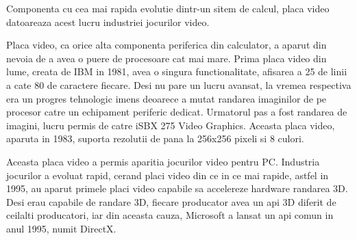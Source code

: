 Componenta cu cea mai rapida evolutie dintr-un sitem de calcul, placa video datoareaza acest lucru
industriei jocurilor video.

Placa video, ca orice alta componenta periferica din calculator, a aparut din nevoia de a avea o
puere de procesoare cat mai mare. Prima placa video din lume, creata de IBM in 1981, avea o singura functionalitate,
afisarea a 25 de linii a cate 80 de caractere fiecare. Desi nu pare un lucru avansat, la vremea
respectiva era un progres tehnologic imens deoarece a mutat randarea imaginilor de pe procesor
catre un echipament periferic dedicat. Urmatorul pas a fost randarea de imagini, lucru permis de
catre iSBX 275 Video Graphics. Aceasta placa video, aparuta in 1983, suporta rezolutii de pana la
256x256 pixeli si 8 culori. 

Aceasta placa video a permis aparitia jocurilor video pentru PC. Industria jocurilor a evoluat
rapid, cerand placi video din ce in ce mai rapide, astfel in 1995, au aparut primele placi video
capabile sa accelereze hardware randarea 3D. Desi erau capabile de randare 3D, fiecare producator
avea un api 3D diferit de ceilalti producatori, iar din aceasta cauza, Microsoft a lansat un api
comun in anul 1995, numit DirectX. 



